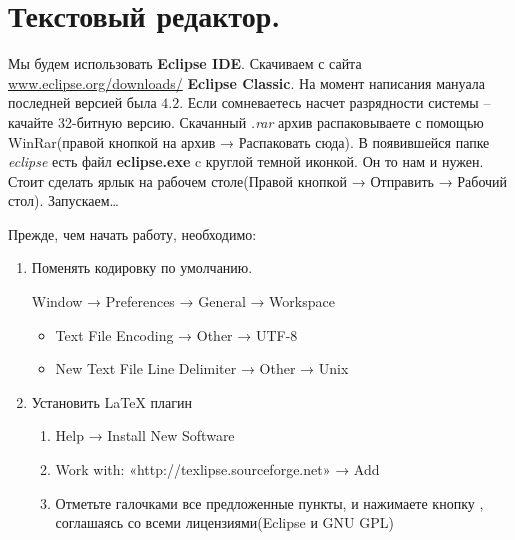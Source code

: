 \section{Текстовый редактор.}
Мы будем использовать {\bf Eclipse IDE}. Скачиваем с сайта \url{www.eclipse.org/downloads/} 
{\bf Eclipse Classic}. На момент написания мануала последней версией была $4.2$. 
Если сомневаетесь насчет разрядности системы -- качайте 32-битную версию. 
Скачанный {\it .rar} архив распаковываете с помощью WinRar(правой кнопкой на архив → Распаковать сюда).
В появившейся папке {\it eclipse} есть файл {\bf eclipse.exe} c круглой темной иконкой. Он то нам и нужен.
Стоит сделать ярлык на рабочем столе(Правой кнопкой → Отправить → Рабочий стол). Запускаем…

Прежде, чем начать работу, необходимо:
\begin{enumerate}
  \item Поменять кодировку по умолчанию. \par
  	Window → Preferences → General → Workspace \par
  	\begin{itemize}
  	  \item Text File Encoding → Other → UTF-8
  	  \item New Text File Line Delimiter → Other → Unix  	  
  	\end{itemize}
  \item Установить LaTeX плагин \par
  	\begin{enumerate}
 		\item Help → Install New Software
 		\item Work with: «http://texlipse.sourceforge.net» →  Add
 		\item Отметьте галочками все предложенные пункты, и нажимаете кнопку ,
 		 соглашаясь со всеми лицензиями(Eclipse и GNU GPL)
 	\end{enumerate}
\end{enumerate}

